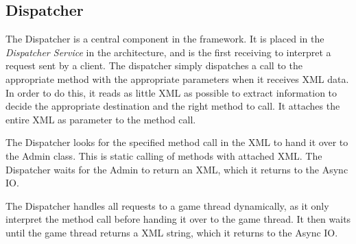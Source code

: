 \subsection{Dispatcher}\label{subsec:dispatcherdesign}
The Dispatcher is a central component in the framework. It is placed in the \textit{Dispatcher Service} in the architecture, and is the first receiving to interpret a request sent by a client. The dispatcher simply dispatches a call to the appropriate method with the appropriate parameters when it receives XML data. In order to do this, it reads as little XML as possible to extract information to decide the appropriate destination and the right method to call. It attaches the entire XML as parameter to the method call.

The Dispatcher looks for the specified method call in the XML to hand it over to the Admin class. This is static calling of methods with attached XML. The Dispatcher waits for the Admin to return an XML, which it returns to the Async IO.

The Dispatcher handles all requests to a game thread dynamically, as it only interpret the method call before handing it over to the game thread. It then waits until the game thread returns a XML string, which it returns to the Async IO.